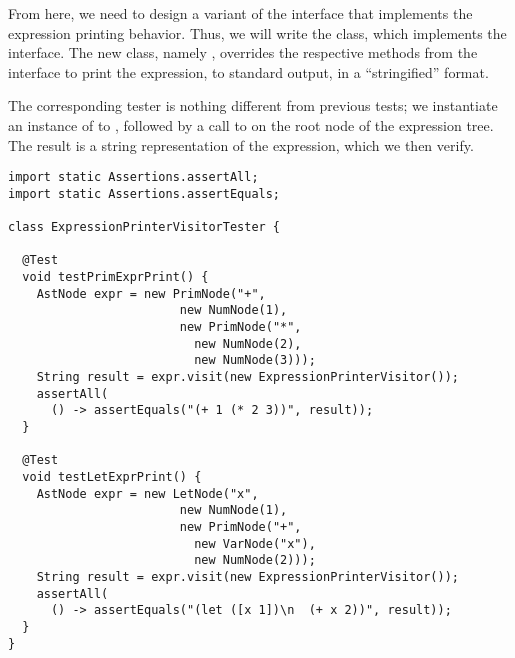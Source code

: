 From here, we need to design a variant of the interface that implements the expression printing behavior. 
Thus, we will write the  class, which implements the  interface. 
The new class, namely , overrides the respective methods from the  interface to print the expression, to standard output, in a ``stringified'' format.

The corresponding tester is nothing different from previous tests; we instantiate an instance of  to , followed by a call to  on the root node of the expression tree. 
The result is a string representation of the expression, which we then verify.

\enlargethispage{-8\baselineskip}
\begin{lstlisting}[language=MyJava]
import static Assertions.assertAll;
import static Assertions.assertEquals;

class ExpressionPrinterVisitorTester {

  @Test
  void testPrimExprPrint() {
    AstNode expr = new PrimNode("+", 
                        new NumNode(1), 
                        new PrimNode("*", 
                          new NumNode(2), 
                          new NumNode(3)));
    String result = expr.visit(new ExpressionPrinterVisitor());
    assertAll(
      () -> assertEquals("(+ 1 (* 2 3))", result));
  }

  @Test
  void testLetExprPrint() {
    AstNode expr = new LetNode("x", 
                        new NumNode(1), 
                        new PrimNode("+", 
                          new VarNode("x"), 
                          new NumNode(2)));
    String result = expr.visit(new ExpressionPrinterVisitor());
    assertAll(
      () -> assertEquals("(let ([x 1])\n  (+ x 2))", result));
  }
}
\end{lstlisting}

